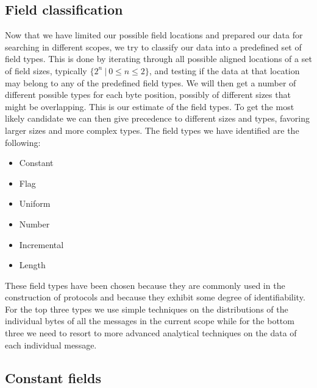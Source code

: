 \documentclass[a4paper]{report}
\begin{document}
\subsection{Field classification}
Now that we have limited our possible field locations and prepared our data for
searching in different scopes, we try to classify our data into a predefined
set of field types. This is done by iterating through all possible aligned
locations of a set of field sizes, typically $\{2^n~|~0 \le n \le 2\}$, and
testing if the data at that location may belong to any of the predefined field
types. We will then get a number of different possible types for each byte
position, possibly of different sizes that might be overlapping. This is our
estimate of the field types. To get the most likely candidate we can then give
precedence to different sizes and types, favoring larger sizes and more complex
types. The field types we have identified are the following:

\begin{itemize}
    \item Constant
    \item Flag
    \item Uniform
    \item Number
    \item Incremental
    \item Length
\end{itemize}

These field types have been chosen because they are commonly used in the
construction of protocols and because they exhibit some degree of
identifiability. For the top three types we use simple techniques on the
distributions of the individual bytes of all the messages in the current scope
while for the bottom three we need to resort to more advanced analytical
techniques on the data of each individual message.

\newpage

\subsection{Constant fields}
\end{document}
